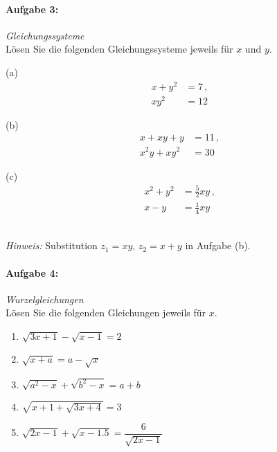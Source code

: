 \paragraph{Aufgabe 3: } \emph{Gleichungssysteme}\\[0.2cm]
Lösen Sie die folgenden Gleichungssysteme jeweils für $x$ und $y$.\\[0.2cm]
\begin{minipage}[t]{0.25\linewidth}
(a)\vspace{-2.6em}
\begin{align*}
x+y^2&=7\,,\\ xy^2&=12
\end{align*}
\end{minipage}\hspace{0.05\linewidth}
\begin{minipage}[t]{0.3\linewidth}
(b)\vspace{-2.6em}
\begin{align*}
x+xy+y&=11\,,\\ x^2y+xy^2&=30
\end{align*}
\end{minipage}\hspace{0.05\linewidth}
\begin{minipage}[t]{0.3\linewidth}
    (c)\vspace{-2.8em}
\begin{align*}
x^2+y^2&=\frac{5}{2}xy\,,\\ x-y&=\frac{1}{4}xy
\end{align*}
\end{minipage}\\
\emph{Hinweis:} Substitution $z_1=xy$, $z_2=x+y$ in Aufgabe (b).

\paragraph{Aufgabe 4: } \emph{Wurzelgleichungen}\\[0.2cm]
Lösen Sie die folgenden Gleichungen jeweils für $x$.
\begin{enumerate}[label=(\alph*)]
    \item $\sqrt{3x+1}-\sqrt{x-1}=2$
    \item $\sqrt{x+a}=a-\sqrt{x}$
    \item $\sqrt{a^2-x}+\sqrt{b^2-x}=a+b$
    \item $\sqrt{x+1+\sqrt{3x+4}}=3$
    \item $\sqrt{2x-1}+\sqrt{x-\num{1,5}}=\dfrac{6}{\sqrt{2x-1}}$
\end{enumerate}
%
